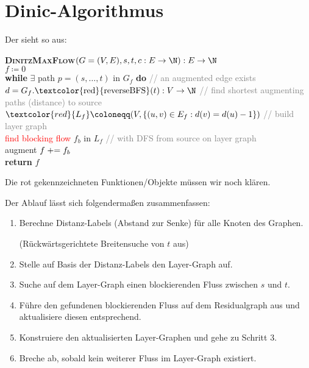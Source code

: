 \section{Dinic-Algorithmus}

Der  sieht so aus:

\begin{pseudocode}
  \textbf{\textsc{DinitzMaxFlow}}\( (G = (V, E), s, t, c: E \to \N) : E \to \N \) \\
  \phantom{\enskip} \( f \coloneqq 0 \) \\
  \phantom{\enskip} \textbf{while} \( \exists \) path \( p = (s,\dots,t) \) in \( G_f \) \textbf{do} \enskip{} \textcolor{gray}{// an augmented edge exists}\\
  \phantom{\enskip} \phantom{\enskip} \( d = G_f\text{.\textcolor{red}{reverseBFS}}(t) : V \to \N \) \enskip{} \textcolor{gray}{// find shortest augmenting paths (distance) to source}\\
  \phantom{\enskip} \phantom{\enskip} \( \textcolor{red}{L_f} \coloneqq (V, \left \{ (u,v) \in E_f : d(v) = d(u) - 1 \right \}) \) \enskip{} \textcolor{gray}{// build layer graph} \\
  \phantom{\enskip} \phantom{\enskip} \textcolor{red}{find blocking flow} \( f_b \) in \( L_f \) \enskip{} \textcolor{gray}{// with DFS from source on layer graph}\\
  \phantom{\enskip} \phantom{\enskip} augment \( f \mathrel{+}= f_b \) \\
  \phantom{\enskip} \textbf{return} \( f \)
\end{pseudocode}

Die rot gekennzeichneten Funktionen/Objekte müssen wir noch klären.

Der Ablauf lässt sich folgendermaßen zusammenfassen:

\begin{enumerate}
  \item Berechne Distanz-Labels (Abstand zur Senke) für alle Knoten des Graphen.

   (Rückwärtsgerichtete Breitensuche von \( t \) aus)
  \item Stelle auf Basis der Distanz-Labels den Layer-Graph auf.
  \item Suche auf dem Layer-Graph einen blockierenden Fluss zwischen \( s \) und \( t \).
  \item Führe den gefundenen blockierenden Fluss auf dem Residualgraph aus und aktualisiere diesen entsprechend.
  \item Konstruiere den aktualisierten Layer-Graphen und gehe zu Schritt 3.
  \item Breche ab, sobald kein weiterer Fluss im Layer-Graph existiert.
\end{enumerate}

